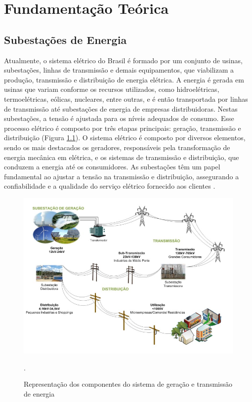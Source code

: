 \chapter{Fundamentação Teórica}

\section{Subestações de Energia}
\label{sec:subestacao}

Atualmente, o sistema elétrico do Brasil é formado por um conjunto de usinas, subestações, linhas de transmissão e demais equipamentos, que viabilizam a produção, transmissão e distribuição de energia elétrica. A energia é gerada em usinas que variam conforme os recursos utilizados, como hidroelétricas, termoelétricas, eólicas, nucleares, entre outras, e é então transportada por linhas de transmissão até subestações de energia de empresas distribuidoras. Nestas subestações, a tensão é ajustada para os níveis adequados de consumo. Esse processo elétrico é composto por três etapas principais: geração, transmissão e distribuição (Figura \ref{fig:substation}). O sistema elétrico é composto por diversos elementos, sendo os mais destacados os geradores, responsáveis pela transformação de energia mecânica em elétrica, e os sistemas de transmissão e distribuição, que conduzem a energia até os consumidores. As subestações têm um papel fundamental ao ajustar a tensão na transmissão e distribuição, assegurando a confiabilidade e a qualidade do serviço elétrico fornecido aos clientes  \cite{lopes2012smart}.

\begin{figure}[!h]
    \centering
    \begin{minipage}{0.9\linewidth}
    \centering
    \captionsetup{justification=centering,margin=0.5cm,font=small}
    \includegraphics[width=0.9\linewidth]{img/cap2/substation.jpeg}
    \caption{Representação dos componentes do sistema de geração e transmissão de energia \cite{lopes2012smart}}.
    \label{fig:substation}
    \end{minipage}
\end{figure}

